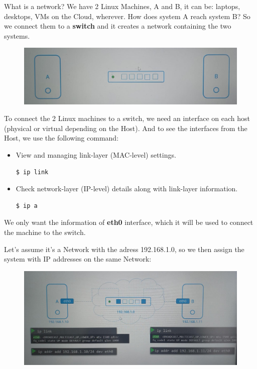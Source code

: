 \documentclass{article}
\newenvironment{codetemplate}[1][]{%
  \mybasecolorbox[#1]
  \itshape
}{%
  \endmybasecolorbox
}
\begin{document}
What is a network? We have 2 Linux Machines, A and B, it can be: laptops, desktops, VMs on the Cloud, wherever. How does system A reach system B? So we connect them to a \textbf{switch} and it creates a network containing the two systems. 

\begin{figure}[H]
    \includegraphics[width=\textwidth]{pictures/ntw.jpg}
\end{figure}

To connect the 2 Linux machines to a switch, we need an interface on each host (physical or virtual depending on the Host). And to see the interfaces from the Host, we use the following command:

\begin{itemize}
    \item View and managing link-layer (MAC-level) settings.
\begin{codetemplate}{}
\begin{verbatim}
$ ip link
\end{verbatim}
\end{codetemplate}

    \item Check network-layer (IP-level) details along with link-layer information.
\begin{codetemplate}{}
\begin{verbatim}
$ ip a
\end{verbatim}
\end{codetemplate}
\end{itemize}

We only want the information of \textbf{eth0} interface, which it will be used to connect the machine to the switch. 

Let's assume it's a Network with the adress 192.168.1.0, so we then assign the system with IP addresses on the same Network:

\begin{figure}[H]
    \includegraphics[width=\textwidth]{pictures/ntw2.png}
\end{figure}
\end{document}
